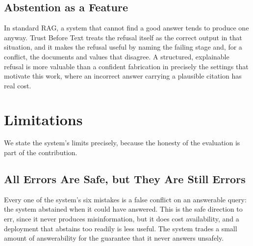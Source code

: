 \documentclass[conference]{IEEEtran}
\begin{document}
\subsection{Abstention as a Feature}
In standard RAG, a system that cannot find a good answer tends to produce
one anyway. Trust Before Text treats the refusal itself as the correct
output in that situation, and it makes the refusal useful by naming the
failing stage and, for a conflict, the documents and values that disagree.
A structured, explainable refusal is more valuable than a confident
fabrication in precisely the settings that motivate this work, where an
incorrect answer carrying a plausible citation has real cost.

\section{Limitations}
\label{sec:limitations}

We state the system's limits precisely, because the honesty of the
evaluation is part of the contribution.

\subsection{All Errors Are Safe, but They Are Still Errors}
Every one of the system's six mistakes is a false conflict on an answerable
query: the system abstained when it could have answered. This is the safe
direction to err, since it never produces misinformation, but it does cost
availability, and a deployment that abstains too readily is less useful. The
system trades a small amount of answerability for the guarantee that it
never answers unsafely.
\end{document}
